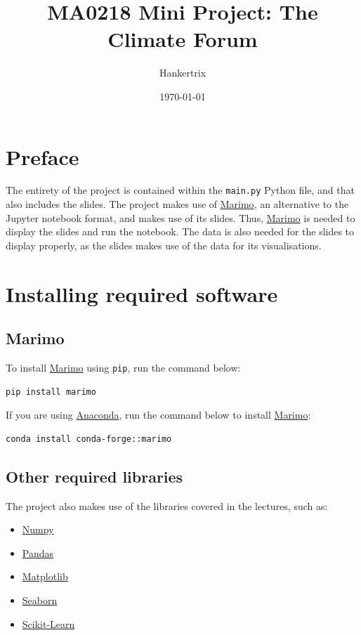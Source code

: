 \documentclass[11pt]{article}
\author{Hankertrix}
\date{\today}
\title{MA0218 Mini Project: The Climate Forum}
\begin{document}
\maketitle
\setcounter{tocdepth}{2}
\tableofcontents \clearpage\section{Preface}
\label{sec:org92c4e57}
The entirety of the project is contained within the \texttt{main.py} Python file,
and that also includes the slides.
The project makes use of \href{https://marimo.io/}{Marimo}, an alternative
to the Jupyter notebook format, and makes use of its slides.
Thus, \href{https://marimo.io/}{Marimo} is needed to display the slides and
run the notebook.
The data is also needed for the slides to display properly,
as the slides makes use of the data for its visualisations.
\section{Installing required software}
\label{sec:orgeeab832}

\subsection{Marimo}
\label{sec:orgbcc1fb6}
To install \href{https://marimo.io/}{Marimo} using \texttt{pip}, run the command below:

\begin{verbatim}
pip install marimo
\end{verbatim}

If you are using \href{https://www.anaconda.com/}{Anaconda},
run the command below to install \href{https://marimo.io/}{Marimo}:

\begin{verbatim}
conda install conda-forge::marimo
\end{verbatim}

\newpage
\subsection{Other required libraries}
\label{sec:org1ce1484}
The project also makes use of the libraries
covered in the lectures, such as:
\begin{itemize}
\item \href{https://numpy.org/}{Numpy}
\item \href{https://pandas.pydata.org/}{Pandas}
\item \href{https://matplotlib.org/}{Matplotlib}
\item \href{https://seaborn.pydata.org/}{Seaborn}
\item \href{https://scikit-learn.org/stable/}{Scikit-Learn}
\end{itemize}
\end{document}
